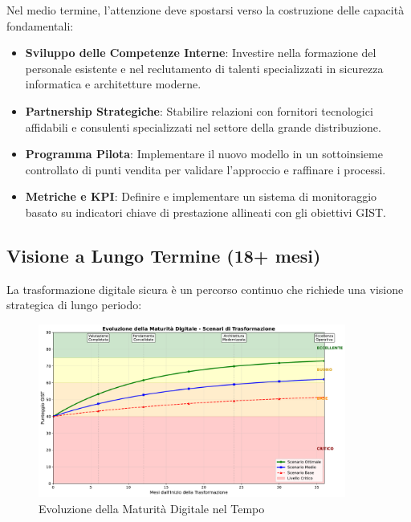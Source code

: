 Nel medio termine, l'attenzione deve spostarsi verso la costruzione delle capacità fondamentali:

\begin{itemize}
\item \textbf{Sviluppo delle Competenze Interne}: Investire nella formazione del personale esistente e nel reclutamento di talenti specializzati in sicurezza informatica e architetture moderne.

\item \textbf{Partnership Strategiche}: Stabilire relazioni con fornitori tecnologici affidabili e consulenti specializzati nel settore della grande distribuzione.

\item \textbf{Programma Pilota}: Implementare il nuovo modello in un sottoinsieme controllato di punti vendita per validare l'approccio e raffinare i processi.

\item \textbf{Metriche e KPI}: Definire e implementare un sistema di monitoraggio basato su indicatori chiave di prestazione allineati con gli obiettivi GIST.
\end{itemize}

\subsection{\texorpdfstring{Visione a Lungo Termine (18+ mesi)}{5.7.3 - Visione a Lungo Termine (18+ mesi)}}
\label{subsec:5.7.3}

La trasformazione digitale sicura è un percorso continuo che richiede una visione strategica di lungo periodo:

\begin{figure}[htbp]
\centering
\includegraphics[width=0.9\textwidth]{thesis_figures/cap5/maturity_evolution.pdf}
\caption{Evoluzione della Maturità Digitale nel Tempo}
\label{fig:maturity_evolution}
\end{figure}


